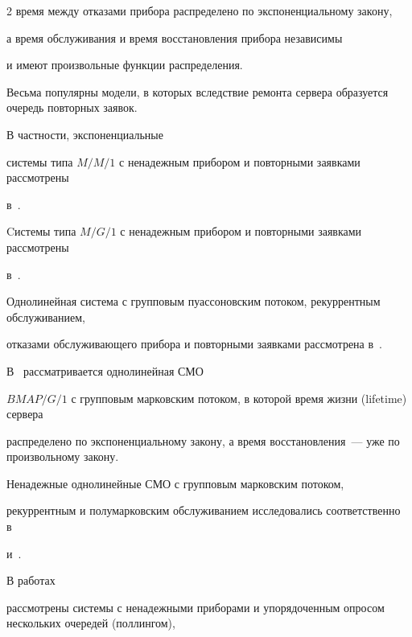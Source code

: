 \begin{multicols}{2}
время между отказами прибора распределено по экспоненциальному закону,


а время обслуживания и время восстановления прибора независимы


и имеют произвольные функции распределения.





Весьма популярны модели, в которых вследствие ремонта сервера образуется очередь повторных заявок.


В частности, экспоненциальные\linebreak


системы типа $M/M/1$ с ненадежным прибором и повторными заявками рассмотрены 


в~\cite{Li-Zhao_2005, Sherman-Kharoufeh_2006, Falin_2008}.


Cистемы типа $M/G/1$ с ненадежным прибором и повторными заявками рассмотрены


в~\cite{Yang-Li_1994, Wang-Cao-Li_2001, Krishna-Kumar-Pavai-Vijayakumar_2002, Djellab_2002, Li-Wang_2006, Sztrik-Almasi-Roszik_2006, Wang_2008}.





Однолинейная система с групповым пуассоновским потоком, рекуррентным обслуживанием,


отказами обслуживающего прибора и повторными заявками рассмотрена в~\cite{Atencia-Bouza-Moreno_2008}.


В~\cite{Li-Ying-Zhao_2006} рассматривается однолинейная СМО


$BM\!AP/G/1$ с групповым марковским потоком, в которой время жизни (lifetime) сервера


распределено по экспоненциальному закону, а время восстановления~--- уже по произвольному закону.


Ненадежные однолинейные СМО с групповым марковским потоком,


рекуррентным и полумарковским обслуживанием исследовались соответственно в~\cite{Dudin-Kazimirsky-Klimenok_2004} 


и~\cite{Dudin_2002}.





В работах~\cite{Ibe-Trivedi_1990, Boxma-Weststrate-Yechiali_1993, Blanc-Mei_1994, Kofman-Yechiali_1996, Almasi_1999, Nakdimon-Yechiali_2001}


рассмотрены системы с ненадежными приборами и упорядоченным опросом нескольких очередей (поллингом),



\end{multicols}
